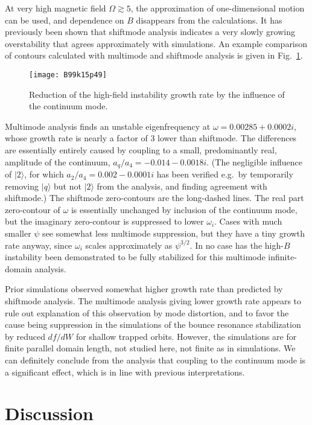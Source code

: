 \documentclass[12pt]{article}
\def\ket#1{|#1\rangle}
\begin{document}
At very high magnetic field $\Omega\gtrsim5$, the approximation of
one-dimensional motion can be used, and dependence on $B$ disappears
from the calculations. It has previously been shown that shiftmode
analysis indicates a very slowly growing overstability that agrees
approximately with simulations\cite{Hutchinson2019a}.  An example
comparison of contours calculated with multimode and shiftmode
analysis is given in Fig.\ \ref{hiB}.
\begin{figure}
  \center  \texttt{[image: B99k15p49]}
  \caption{Reduction of the high-field instability growth rate by the
    influence of the continuum mode.\label{hiB}}
\end{figure}
Multimode analysis finds an unstable eigenfrequency at
$\omega=0.00285+0.0002i$, whose growth rate is nearly a factor of 3
lower than shiftmode.  The differences are essentially entirely caused
by coupling to a small, predominantly real, amplitude of the
continuum, $a_q/a_4=-0.014-0.0018i$. (The negligible influence of
$\ket{2}$, for which $a_2/a_4=0.002-0.0001i$ has been verified e.g.\
by temporarily removing $\ket{q}$ but not $\ket{2}$ from the analysis,
and finding agreement with shiftmode.)  The shiftmode zero-contours
are the long-dashed lines. The real part zero-contour of $\omega$ is
essentially unchanged by inclusion of the continuum mode, but the
imaginary zero-contour is suppressed to lower $\omega_i$. Cases with
much smaller $\psi$ see somewhat less multimode suppression, but they
have a tiny growth rate anyway, since $\omega_i$ scales approximately
as $\psi^{3/2}$. In no case has the high-$B$ instability been
demonstrated to be fully stabilized for this multimode infinite-domain
analysis.

Prior simulations observed somewhat higher growth rate than predicted
by shiftmode analysis.  The multimode analysis giving lower growth
rate appears to rule out explanation of this observation by mode
distortion, and to favor the cause being suppression in the
simulations of the bounce resonance stabilization by reduced $df/dW$
for shallow trapped orbits. However, the simulations are for finite
parallel domain length, not studied here, not finite as in
simulations.  We can definitely conclude from the analysis that
coupling to the continuum mode is a significant effect, which is in
line with previous interpretations. 


\section{Discussion}
\end{document}
